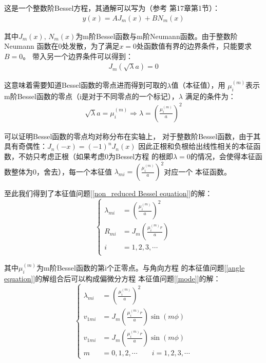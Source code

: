\documentclass[a4paper]{ctexart}
\begin{document}
	\par 
	这是一个整数阶Bessel方程，其通解可以写为（参考\cite{mathematicalmethod}
	第17章第1节）：
	\begin{align}
		y(x) = AJ_{m}(x) + BN_{m}(x)
	\end{align}
	\par 其中$J_{m}(x),\,N_{m}(x)$为m阶Bessel函数与m阶Neumann函数。由于整数阶Neumann
	函数在0处发散，为了满足$x=0$处函数值有界的边界条件，只能要求$B=0$。
	带入另一个边界条件可以得到：
	\begin{align}
		J_{m}(\sqrt{\lambda}a) = 0
	\end{align}
	\par 这意味着需要知道Bessel函数的零点进而得到可取的$\lambda$值（本征值），用
	$\mu_{i}^{(m)}$表示m阶Bessel函数的零点（i是对于不同零点的一个标记），$\lambda$
	满足的条件为：
	\begin{align}
		\sqrt{\lambda} a = \mu_{i}^{(m)}
		\Rightarrow \lambda = \left(\frac{\mu_{i}^{(m)}}{a}\right)^2 
	\end{align}
	\par 可以证明Bessel函数的零点均对称分布在实轴上\cite{specialfunction}，
	对于整数阶Bessel函数，由于其具有奇偶性\cite{mathematicalmethod}：$J_n(-x) = (-1)^n J_n(x)$
	因此正根和负根给出线性相关的本征函数，不妨只考虑正根（如果考虑0为Bessel方程
	的根即$\lambda = 0$的情况，会使得本征函数整体为0，舍去），每一个本征值
	$\lambda_{mi} = \left(\frac{\mu_{i}^{(m)}}{a}\right)^2$对应一个
	本征函数。
	\par
	至此我们得到了本征值问题[\ref{non_reduced Bessel equation}]的解：
	\begin{equation}
		\left\{ 
		\begin{split}
			\lambda_{mi} &= \left(\frac{\mu_{i}^{(m)}}{a}\right)^2\\
			R_{mi} &= J_{m}\left(\frac{\mu_{i}^{(m)}r}{a}\right)\\
			i &= 1, 2, 3,\cdots\\
		\end{split}
		\right.
	\end{equation}
	\par  其中$\mu_{i}^{(m)}$为m阶Bessel函数的第i个正零点。与角向方程
	的本征值问题[\ref{angle equation}]的解组合后可以构成偏微分方程
	本征值问题[\ref{mode}]的解：
	\begin{equation}
		\left\{
		\begin{split}
			\lambda_{mi} &= \left(\frac{\mu_{i}^{(m)}}{a}\right)^2\\
			v_{1mi} &= J_m\left(\frac{\mu_{i}^{(m)}r}{a}\right)\sin(m\phi)\\
			v_{1mi} &= J_m\left(\frac{\mu_{i}^{(m)}r}{a}\right)\sin(m\phi)\\
			m &= 0,1,2,\cdots\quad \quad i = 1, 2, 3,\cdots
		\end{split}
		\right.
	\end{equation}
\end{document}
